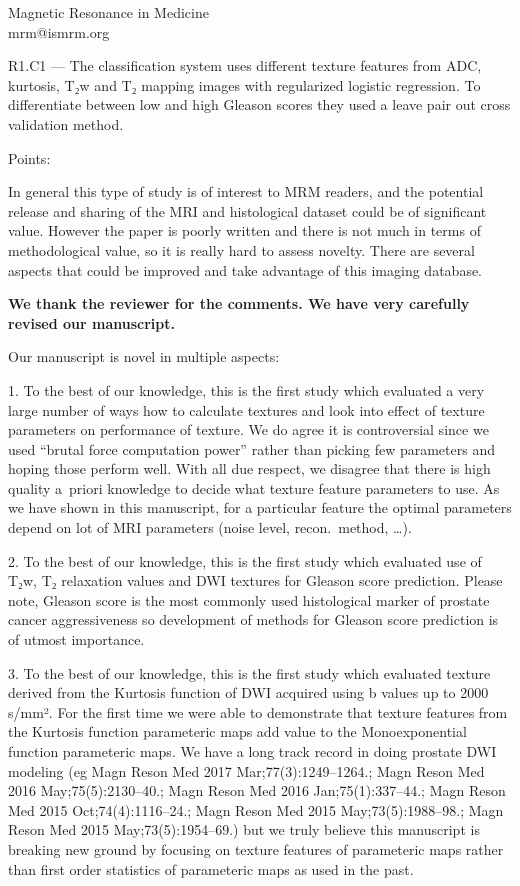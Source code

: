 \documentclass{letter}
\newenvironment{comment}[1]%
  {\vspace{5ex}\par\textsf{#1 ---} \ignorespaces}%
  {\par\ignorespacesafterend}
\newenvironment{reply}%
  {\vspace{2ex}\par\bfseries}%
  {\par\upshape}
\begin{document}
\begin{letter}{Magnetic Resonance in Medicine \\ mrm@ismrm.org}
\begin{comment}{R1.C1}
The classification system uses different texture features from ADC, kurtosis,
T₂w and T₂ mapping images with regularized logistic regression. To differentiate
between low and high Gleason scores they used a leave pair out cross validation
method.

Points:

In general this type of study is of interest to MRM readers, and the potential
release and sharing of the MRI and histological dataset could be of significant
value. However the paper is poorly written and there is not much in terms of
methodological value, so it is really hard to assess novelty. There are several
aspects that could be improved and take advantage of this imaging database.
\end{comment}

\begin{reply}
We thank the reviewer for the comments. We have very carefully revised our
manuscript.

Our manuscript is novel in multiple aspects:

1. To the best of our knowledge, this is the first study which evaluated a very
large number of ways how to calculate textures and look into effect of texture
parameters on performance of texture. We do agree it is controversial since we
used ``brutal force computation power'' rather than picking few parameters and
hoping those perform well. With all due respect, we disagree that there is high
quality a~priori knowledge to decide what texture feature parameters to use. As
we have shown in this manuscript, for a particular feature the optimal
parameters depend on lot of MRI parameters (noise level, recon.\ method, …).

2. To the best of our knowledge, this is the first study which evaluated use of
T₂w, T₂ relaxation values and DWI textures for Gleason score prediction. Please
note, Gleason score is the most commonly used histological marker of prostate
cancer aggressiveness so development of methods for Gleason score prediction is
of utmost importance.

3. To the best of our knowledge, this is the first study which evaluated texture
derived from the Kurtosis function of DWI acquired using b values up to 2000
s/mm². For the first time we were able to demonstrate that texture features from
the Kurtosis function parameteric maps add value to the Monoexponential function
parameteric maps. We have a long track record in doing prostate DWI modeling (eg
Magn Reson Med 2017 Mar;77(3):1249--1264.; Magn Reson Med 2016
May;75(5):2130--40.; Magn Reson Med 2016 Jan;75(1):337--44.; Magn Reson Med
2015 Oct;74(4):1116--24.; Magn Reson Med 2015 May;73(5):1988--98.; Magn Reson
Med 2015 May;73(5):1954--69.) but we truly believe this manuscript is breaking
new ground by focusing on texture features of parameteric maps rather than first
order statistics of parameteric maps as used in the past.
\end{reply}



\end{letter}
\end{document}

